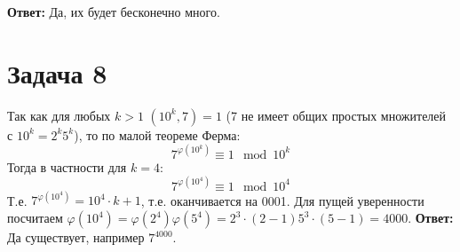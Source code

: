\documentclass{article}
\begin{document}
		  \textbf{Ответ:} Да, их будет бесконечно много.
		  
		  \section {Задача 8}
		  Так как для любых $k > 1$ $(10^k, 7) = 1$ (7 не имеет общих простых множителей с $10^k=2^k5^k$), то по малой теореме Ферма:
			  $$ 7^{\varphi(10^k)} \equiv 1 \mod 10^k $$
		  Тогда в частности для $k=4:$
			  $$ 7^{\varphi(10^4)} \equiv 1 \mod 10^4 $$
		  Т.е. $7^{\varphi(10^4)} = 10^4\cdot k + 1$, т.е. оканчивается на 0001. Для пущей уверенности посчитаем $\varphi(10^4) = \varphi(2^4)\varphi(5^4) = 2^3\cdot(2 - 1) 5^3 \cdot(5 - 1) = 4000$. 
		  \textbf {Ответ:} Да существует, например $7^4000$.
\end{document}
